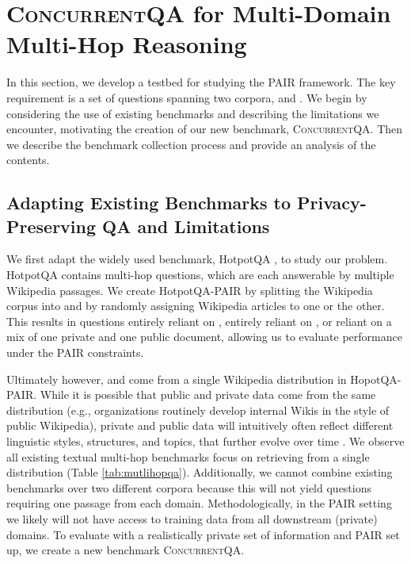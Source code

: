 \documentclass{article}
\renewcommand\cite{\citep}	\newcommand\shortcite{\citeyearpar}\newcommand\newcite{\citet}
\newcommand{\datasetname}{\textsc{ConcurrentQA}\xspace}
\newcommand{\problemshortname}{\textsc{PAIR}\xspace}
\begin{document}
\section{\datasetname for Multi-Domain Multi-Hop Reasoning}
\label{sec:benchmark}
In this section, we develop a testbed for studying the \problemshortname framework. The key requirement is a set of questions spanning two corpora,  and . We begin by considering the use of existing benchmarks and describing the limitations we encounter, motivating the creation of our new benchmark, \datasetname. Then we describe the benchmark collection process and provide an analysis of the contents.


\subsection{Adapting Existing Benchmarks to Privacy-Preserving QA and Limitations}  We first adapt the widely used benchmark, HotpotQA \cite{yang2018hotpotqa}, to study our problem. 
HotpotQA contains multi-hop questions, which are each answerable by multiple Wikipedia passages. We create HotpotQA-\problemshortname by splitting the Wikipedia corpus into  and  by randomly assigning Wikipedia articles to one or the other. This results in questions entirely reliant on , entirely reliant on , or reliant on a mix of one private and one public document, allowing us to evaluate performance under the \problemshortname constraints.


Ultimately however,  and  come from a single Wikipedia distribution in HopotQA-PAIR.
While it is possible that public and private data come from the same distribution (e.g., organizations routinely develop internal Wikis in the style of public Wikipedia), private and public data will intuitively often reflect different linguistic styles, structures, and topics, that further evolve over time \cite{hawking2004enterprisesearch}. 
We observe all existing textual multi-hop benchmarks focus on retrieving from a single distribution (Table \ref{tab:mutlihopqa}). Additionally, we cannot combine existing benchmarks over two different corpora because this will not yield questions requiring one passage from each domain. 
Methodologically, in the \problemshortname setting we likely will not have access to training data from all downstream (private) domains. 
To evaluate with a realistically private set of information and \problemshortname set up, we create a new benchmark \datasetname.
\end{document}
